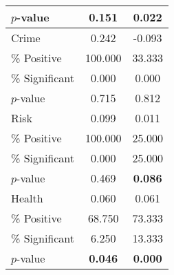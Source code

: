 \begin{tabular}{lcc}
\quad $p$-value &     0.151 &     \textbf{0.022} \\  
 \midrule
Crime &     0.242 &    -0.093 \\  
\quad \% Positive &   100.000 &    33.333 \\  
\quad \% Significant &     0.000 &     0.000 \\  
\quad $p$-value &     0.715 &     0.812 \\  
 \midrule
Risk &     0.099 &     0.011 \\  
\quad \% Positive &   100.000 &    25.000 \\  
\quad \% Significant &     0.000 &    25.000 \\  
\quad $p$-value &     0.469 &     \textbf{0.086} \\  
 \midrule
Health &     0.060 &     0.061 \\  
\quad \% Positive &    68.750 &    73.333 \\  
\quad \% Significant &     6.250 &    13.333 \\  
\quad $p$-value &     \textbf{0.046} &     \textbf{0.000} \\  
\bottomrule
\end{tabular}


